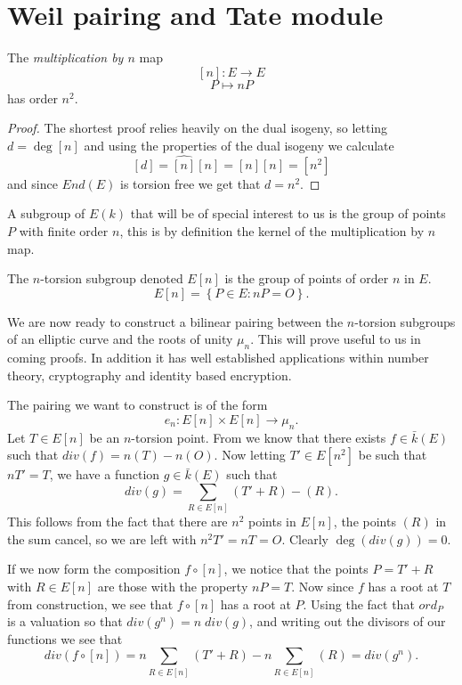 \section{Weil pairing and Tate module}

\begin{prop}
 The \emph{multiplication by $n$} map
$$ [n] : E \rightarrow E $$
$$ P \mapsto nP $$
has order $n^2$.
\end{prop}
\begin{proof}
The shortest proof relies heavily on the dual isogeny, so letting $d = \deg [n]$ and using the properties of 
the dual isogeny we calculate
$$ [d] = \widehat{[n]}[n] = [n][n] = [n^2] $$
and since $End(E)$ is torsion free \cite{AEC} we get that $d = n^2$.
\end{proof}

A subgroup of $E(k)$ that will be of special interest to us is the group of points $P$
with finite order $n$, this is by definition the kernel of the multiplication by $n$ map.
\begin{mydef}
 The $n$-torsion subgroup denoted $E[n]$ is the group of points of order $n$ in $E$.
$$ E[n] = \left\{ P\in E : nP = O \right\}.$$
\end{mydef}

We are now ready to construct a bilinear pairing between the $n$-torsion subgroups of
an elliptic curve and the roots of unity $\mu_n$. This will prove useful to us in coming
proofs. In addition it has well established applications within number theory, cryptography
and identity based encryption.

The pairing we want to construct is of the form
$$ e_n : E[n] \times E[n] \rightarrow \mu_n.$$
Let $T\in E[n]$ be an $n$-torsion point. From \cite{Lawrence} we know that there exists
$f \in \bar{k}(E)$ such that $div(f) = n(T) - n(O)$. Now letting $T' \in E[n^2]$ be such
that $nT' = T$, we have a function $g \in \bar{k}(E)$ such that
$$ div(g) = \sum_{R\in E[n]} (T'+R)-(R). $$
This follows from the fact that there are $n^2$ points in $E[n]$, the points $(R)$ in the
sum cancel, so we are left with $n^2 T' = nT = O$. Clearly $\deg(div(g)) = 0$.

If we now form the composition $f \circ [n]$, we notice that the points $P = T' + R$ with
$R\in E[n]$ are those with the property $nP = T$. Now since $f$ has a root at $T$ from
construction, we see that $f \circ [n]$ has a root at $P$. Using the fact that $ord_P$ is a valuation
so that $div(g^n) = n\;div(g)$, and writing out the divisors of our functions we see that
$$ div(f \circ [n]) = n\sum_{R\in E[n]} (T'+R) - n\sum_{R\in E[n]} (R) = div(g^n).$$

